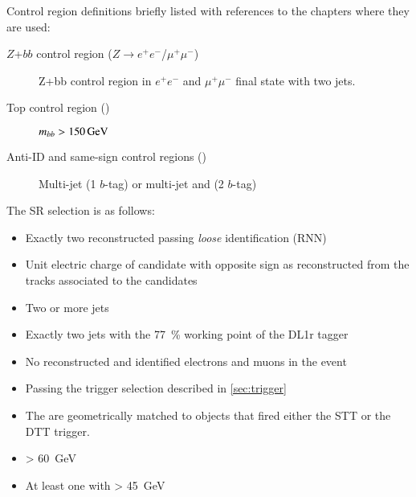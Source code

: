 Control region definitions briefly listed with references to the
chapters where they are used:
\begin{description}

\item[$Z$+$bb$ control region ($Z \to e^+e^-$/$\mu^+\mu^-$)] Z+bb
  control region in $e^+e^-$ and $\mu^+\mu^-$ final state with two
  \btagged jets.

\item[Top control region (\lephad)] $m_{bb} > \SI{150}{\ensuremath{\text{GeV}}}$

\item[Anti-ID and same-sign control regions (\hadhad)] Multi-jet (1
  $b$-tag) or multi-jet and \ttbar (2 $b$-tag)

\item[]

\end{description}


The SR selection is as follows:
\begin{itemize}
\item Exactly two reconstructed \tauhadvis passing \textit{loose} identification
  (RNN)

\item Unit electric charge of \tauhadvis candidate with opposite sign as
  reconstructed from the tracks associated to the \tauhadvis candidates

\item Two or more jets

\item Exactly two \btagged jets with the \SI{77}{\percent} working point of the
  DL1r tagger

\item No reconstructed and identified electrons and muons in the event

\item Passing the trigger selection described in \cref{sec:trigger}

\item The \tauhadvis are geometrically matched to objects that fired either the
  STT or the DTT trigger.

\item \mMMC > \SI{60}{\GeV}

\item At least one \bjet with \pT > \SI{45}{\GeV} 
\end{itemize}


